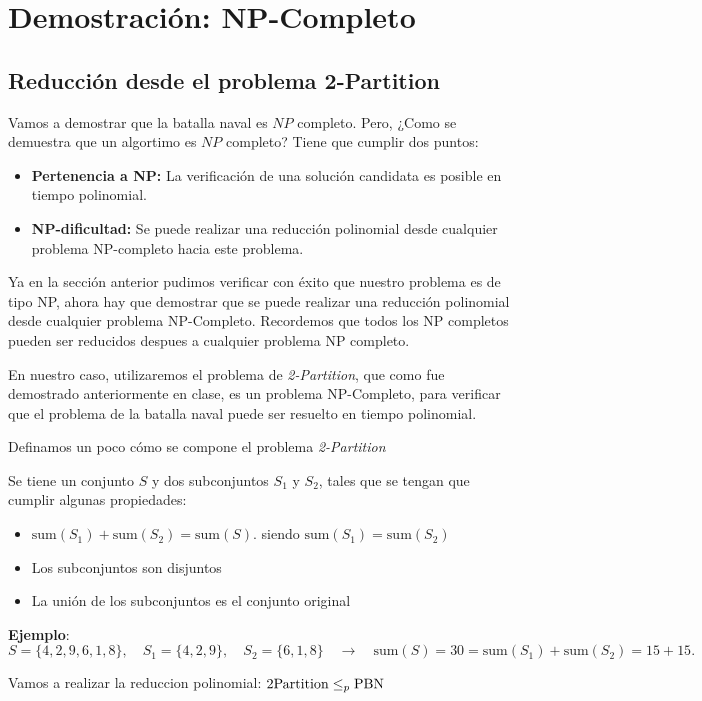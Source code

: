 \section{Demostración: NP-Completo}


\subsection*{Reducción desde el problema 2-Partition}

Vamos a demostrar que la batalla naval es $NP$ completo. Pero, ¿Como se demuestra que un algortimo es $NP$ completo? Tiene que cumplir dos puntos: 

\begin{itemize}
    \item \textbf{Pertenencia a NP:} La verificación de una solución candidata es posible en tiempo polinomial.
    \item \textbf{NP-dificultad:} Se puede realizar una reducción polinomial desde cualquier problema NP-completo hacia este problema.
\end{itemize}

Ya en la sección anterior pudimos verificar con éxito que nuestro problema es de tipo NP, ahora hay que demostrar que se puede realizar una reducción polinomial desde cualquier problema NP-Completo. Recordemos que todos los NP completos pueden ser reducidos despues a cualquier problema NP completo. 

En nuestro caso, utilizaremos el problema de \textit{2-Partition}, que como fue demostrado anteriormente en clase, es un problema NP-Completo, para verificar que el problema de la batalla naval puede ser resuelto en tiempo polinomial. 


Definamos un poco cómo se compone el problema \textit{2-Partition}


Se tiene un conjunto $S$ y dos subconjuntos $S_1$ y $S_2$, tales que se tengan que cumplir algunas propiedades:
\begin{itemize}
    \item $\text{sum}(S_1) + \text{sum}(S_2) = \text{sum}(S)$. siendo $\text{sum}(S_1) = \text{sum}(S_2)$
    \item Los subconjuntos son disjuntos
    \item La unión de los subconjuntos es el conjunto original
\end{itemize}

\textbf{Ejemplo}:
$S = \{4, 2, 9, 6, 1, 8\}, \quad S_1 = \{4, 2, 9\}, \quad S_2 = \{6, 1, 8\} \quad \rightarrow \quad \text{sum}(S) = 30 = \text{sum}(S_1) + \text{sum}(S_2) = 15 + 15.$

Vamos a realizar la reduccion polinomial: $\text{2\-Partition} \leq_p \text{PBN}$

